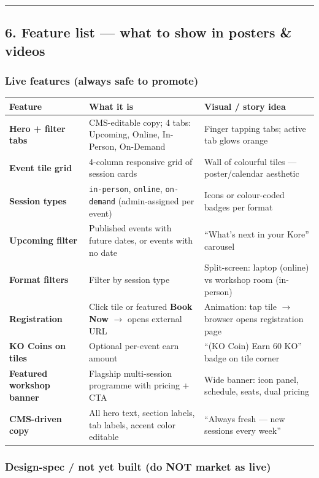 \documentclass[11pt,a4paper]{report}
\begin{document}
\medskip\hrule\medskip

\subsection{6. Feature list --- what to show in posters \& videos}

\subsubsection{Live features (always safe to promote)}

\begin{longtable}{|l|l|l|}
\hline
Feature & What it is & Visual / story idea \\ \hline
\textbf{Hero + filter tabs} & CMS-editable copy; 4 tabs: Upcoming, Online, In-Person, On-Demand & Finger tapping tabs; active tab glows orange \\ \hline
\textbf{Event tile grid} & 4-column responsive grid of session cards & Wall of colourful tiles --- poster/calendar aesthetic \\ \hline
\textbf{Session types} & \texttt{in-person}, \texttt{online}, \texttt{on-demand} (admin-assigned per event) & Icons or colour-coded badges per format \\ \hline
\textbf{Upcoming filter} & Published events with future dates, or events with no date & “What’s next in your Kore” carousel \\ \hline
\textbf{Format filters} & Filter by session type & Split-screen: laptop (online) vs workshop room (in-person) \\ \hline
\textbf{Registration} & Click tile or featured \textbf{Book Now} $\rightarrow$ opens external URL & Animation: tap tile $\rightarrow$ browser opens registration page \\ \hline
\textbf{KO Coins on tiles} & Optional per-event earn amount & “(KO Coin) Earn 60 KO” badge on tile corner \\ \hline
\textbf{Featured workshop banner} & Flagship multi-session programme with pricing + CTA & Wide banner: icon panel, schedule, seats, dual pricing \\ \hline
\textbf{CMS-driven copy} & All hero text, section labels, tab labels, accent color editable & “Always fresh --- new sessions every week” \\
\hline
\end{longtable}


\subsubsection{Design-spec / not yet built (do NOT market as live)}
\end{document}
